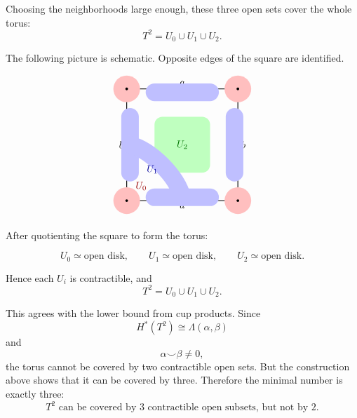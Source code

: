 \documentclass[12pt,a4paper]{article}
\theoremstyle{notespace}
\begin{document}
Choosing the neighborhoods large enough, these three open sets cover the whole torus:
\[
T^2=U_0\cup U_1\cup U_2.
\]

The following picture is schematic. Opposite edges of the square are identified.

\[
\begin{tikzpicture}[scale=4, line cap=round, line join=round]
	
	\draw[thick] (0,0) rectangle (1,1);
	
	\draw[->, thick] (0.22,0) -- (0.78,0);
	\node[below] at (0.5,0) {$a$};
	
	\draw[->, thick] (0.78,1) -- (0.22,1);
	\node[above] at (0.5,1) {$a$};
	
	\draw[->, thick] (0,0.22) -- (0,0.78);
	\node[left] at (0,0.5) {$b$};
	
	\draw[->, thick] (1,0.78) -- (1,0.22);
	\node[right] at (1,0.5) {$b$};
	
	\fill[green!25, rounded corners=8pt] (0.25,0.25) rectangle (0.75,0.75);
	\node[green!45!black, font=\bfseries] at (0.5,0.5) {$U_2$};
	
	\draw[blue!25, line width=18pt] (0.25,0.03) -- (0.75,0.03);
	\draw[blue!25, line width=18pt] (0.25,0.97) -- (0.75,0.97);
	\draw[blue!25, line width=18pt] (0.03,0.25) -- (0.03,0.75);
	\draw[blue!25, line width=18pt] (0.97,0.25) -- (0.97,0.75);
	\draw[blue!25, line width=18pt] (0.5,0.03) .. controls (0.45,0.22) and (0.22,0.45) .. (0.03,0.5);
	
	\node[blue!60!black, font=\bfseries] at (0.23,0.28) {$U_1$};
	
	\foreach \x/\y in {0/0,1/0,0/1,1/1}
	{
		\fill[red!25] (\x,\y) circle (0.12);
	}
	\node[red!60!black, font=\bfseries] at (0.13,0.13) {$U_0$};
	
	\foreach \x/\y in {0/0,1/0,0/1,1/1}
	{
		\fill (\x,\y) circle (0.012);
	}
	
\end{tikzpicture}
\]

After quotienting the square to form the torus:

\[
\boxed{
	U_0\simeq \text{open disk},
	\qquad
	U_1\simeq \text{open disk},
	\qquad
	U_2\simeq \text{open disk}.
}
\]

Hence each \(U_i\) is contractible, and
\[
\boxed{
	T^2=U_0\cup U_1\cup U_2.
}
\]

This agrees with the lower bound from cup products. Since
\[
H^*(T^2)\cong \Lambda(\alpha,\beta)
\]
and
\[
\alpha\smile\beta\neq 0,
\]
the torus cannot be covered by two contractible open sets. But the construction above shows that it can be covered by three. Therefore the minimal number is exactly three:
\[
\boxed{
	T^2 \text{ can be covered by } 3 \text{ contractible open subsets, but not by } 2.
}
\]
\end{document}

